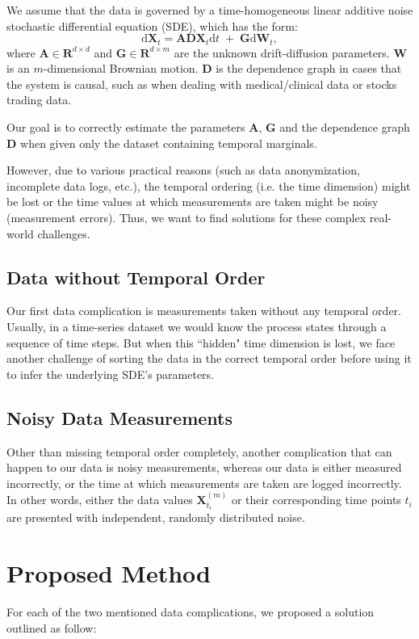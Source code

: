 \documentclass[a4paper, 11pt]{article}
\begin{document}
\begin{sloppypar}
We assume that the data is governed by a time-homogeneous linear additive noise stochastic
differential equation (SDE), which has the form:
\[
\mathrm{d}\mathbf{X}_t 
= 
\mathbf{A}\mathbf{D}\mathbf{X}_t\mathrm{d}t 
\;+\; 
\mathbf{G}\mathrm{d}\mathbf{W}_t,
\]
where $\mathbf{A} \in \mathbf{R}^{d \times d}$ and $\mathbf{G} \in \mathbf{R}^{d \times m}$ are the 
unknown drift-diffusion parameters. $\mathbf{W}$ is an $m$-dimensional Brownian motion.
$\mathbf{D}$ is the dependence graph in cases that the system is causal, such as when dealing with
medical/clinical data or stocks trading data.

Our goal is to correctly estimate the parameters $\mathbf{A}$, $\mathbf{G}$ and the dependence graph
$\mathbf{D}$ when given only the dataset containing temporal marginals.

However, due to various practical reasons (such as data anonymization, 
incomplete data logs, etc.), the temporal ordering
(i.e. the time dimension) might be lost or the time values 
at which measurements are taken might be noisy (measurement errors).
Thus, we want to find solutions for these complex real-world challenges.

\subsection{Data without Temporal Order}
Our first data complication is measurements taken without any temporal order. Usually,
in a time-series dataset we would know the process states through a sequence of time steps.
But when this ``hidden" time dimension is lost, we face another challenge of sorting the data
in the correct temporal order before using it to infer the underlying SDE's parameters.

\subsection{Noisy Data Measurements}
Other than missing temporal order completely, another complication that can happen to
our data is noisy measurements, whereas our data is either measured incorrectly,
or the time at which measurements are taken are logged incorrectly. In other words,
either the data values $\mathbf{X}_{t_{i}}^{(m)}$ or their corresponding time points
$t_{i}$ are presented with independent,
randomly distributed noise.

\section{Proposed Method}\label{s:2}
For each of the two mentioned data complications, we proposed a solution outlined as follow:


\end{sloppypar}
\end{document}
